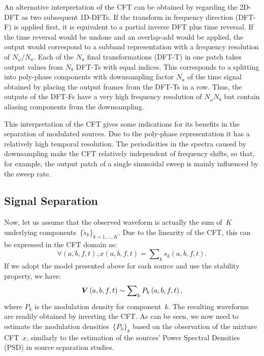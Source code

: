 An alternative interpretation of the CFT can be obtained by regarding the 2D-DFT
as two subsequent 1D-DFTs. If the transform in frequency direction (DFT-F) is
applied first, it is equivalent to a partial inverse DFT plus time reversal. If
the time reversal would be undone and an overlap-add would be applied, the
output would correspond to a subband representation with a frequency resolution
of $N_\omega / N_a$. Each of the $N_a$ final transformations (DFT-T) in one
patch takes output values from $N_b$ DFT-Ts with equal indices. This corresponds
to a splitting into poly-phase components with downsampling factor $N_a$ of the
time signal obtained by placing the output frames from the DFT-Ts in a row.
Thus, the outputs of the DFT-Fs have a very high frequency resolution of
$N_\omega N_b$ but contain aliasing components from the downsampling.
\par
This interpretation of the CFT gives some indications for its benefits in the
separation of modulated sources. Due to the poly-phase representation it has a
relatively high temporal resolution. The periodicities in the spectra caused
by downsampling make the CFT relatively independent of frequency shifts, so
that, for example, the output patch of a single sinusoidal sweep is mainly
influenced by the sweep rate.


\subsection{Signal Separation}
Now, let us assume that the observed waveform is actually the sum
of~$K$ underlying components~$\{ \tilde{s}_{k}\} _{k=1,\dots,K}$.
Due to the linearity of the CFT, this can be
expressed in the CFT domain as:
$$
\forall\left(a,b,f,t\right),x\left(a,b,f,t\right)=\sum\nolimits_{k}s_{k}\left(a,b,f,t\right).
$$
If we adopt the model presented above for each source
and use the stability property, we have:
$$
{\bm{V}}\left(a,b,f,t\right)\sim \sum\nolimits_{k}P_{k}\left(a,b,f,t\right),
$$
where $P_{k}$ is the modulation density for component~$k$.
The resulting waveforms are readily obtained by inverting the CFT.\@
As can be seen, we now need to estimate the modulation
densities~$\{ P_{k}\}_{k}$ based on the observation
of the mixture CFT~$x$, similarly to the estimation of
 the sources' Power Spectral Densities (PSD)
in source separation studies.


